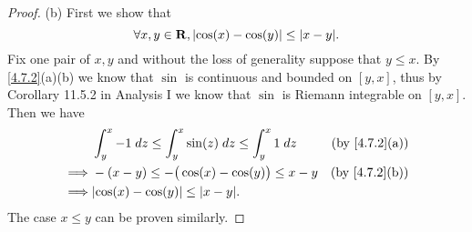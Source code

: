 \begin{proof}{(b)}
  First we show that
  \[
    \forall x, y \in \R, \abs{\cos(x) - \cos(y)} \leq \abs{x - y}.
  \]
  Fix one pair of \(x, y\) and without the loss of generality suppose that \(y \leq x\).
  By \cref{4.7.2}(a)(b) we know that \(\sin\) is continuous and bounded on \([y, x]\), thus by Corollary 11.5.2 in Analysis I we know that \(\sin\) is Riemann integrable on \([y, x]\).
  Then we have
  \begin{align*}
             & \int_y^x -1 \; dz \leq \int_y^x \sin(z) \; dz \leq \int_y^x 1 \; dz & \text{(by \cref{4.7.2}(a))} \\
    \implies & -(x - y) \leq -\big(\cos(x) - \cos(y)\big) \leq x - y               & \text{(by \cref{4.7.2}(b))} \\
    \implies & \abs{\cos(x) - \cos(y)} \leq \abs{x - y}.
  \end{align*}
  The case \(x \leq y\) can be proven similarly.


\end{proof}
